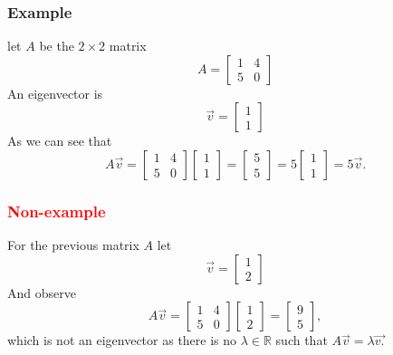 \documentclass[12pt]{article}
\begin{document}
\subsubsection*{Example}
let $A$ be the $2 \times 2$ matrix
\[A=\begin{bmatrix}
  1 & 4 \\
  5 & 0
\end{bmatrix}\]
An eigenvector is 
\[\vec{v}=\begin{bmatrix}
    1\\
    1
\end{bmatrix}\]
As we can see that 
\[A\vec{v}=\begin{bmatrix}
  1 & 4 \\
  5 & 0
\end{bmatrix}\begin{bmatrix}
    1\\
    1
\end{bmatrix}=\begin{bmatrix}
    5\\
    5
\end{bmatrix}=5\begin{bmatrix}
    1\\
    1
\end{bmatrix}=5 \vec{v}.\]
\subsubsection*{\textcolor{red}{Non-example}}
For the previous matrix $A$ let \[\vec{v}=\begin{bmatrix}
    1\\
    2
\end{bmatrix}\]
And observe
\[A\vec{v}=\begin{bmatrix}
  1 & 4 \\
  5 & 0
\end{bmatrix}\begin{bmatrix}
    1\\
    2
\end{bmatrix}=\begin{bmatrix}
    9\\
    5
\end{bmatrix},\]
which is not an eigenvector as there is no $\lambda \in \mathbb{R}$ such that $A\vec{v}=\lambda \vec{v.}$
\end{document}
